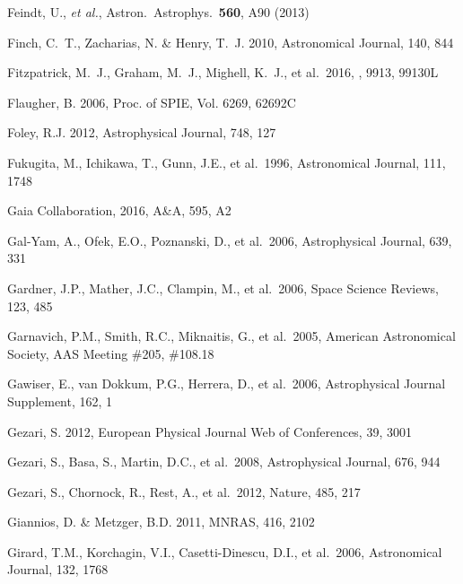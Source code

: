 \documentclass[twocolumn]{aastex61}
\begin{document}
\begin{thebibliography}{}
 Feindt, U., {\it et al.}, Astron.\ Astrophys.\  {\bf 560}, A90 (2013)

 Finch, C.~T., Zacharias, N. \& Henry, T.~J. 2010, Astronomical Journal, 140, 844

 Fitzpatrick, M.~J., Graham, M.~J., Mighell, K.~J., et al.\ 2016, \procspie, 9913, 99130L

 Flaugher, B. 2006, Proc. of SPIE, Vol. 6269, 62692C

 Foley, R.J. 2012, Astrophysical Journal, 748, 127

 Fukugita, M., Ichikawa, T., Gunn, J.E., et al.~1996, Astronomical Journal, 111, 1748

 Gaia Collaboration, 2016, A\&A, 595, A2

 Gal-Yam, A., Ofek, E.O., Poznanski, D., et al.~2006, Astrophysical Journal, 639, 331

 Gardner, J.P., Mather, J.C., Clampin, M., et al.~2006, Space Science Reviews, 123, 485

 Garnavich, P.M., Smith, R.C., Miknaitis, G., et al.~2005, American Astronomical Society, AAS Meeting \#205, \#108.18

 Gawiser, E., van Dokkum, P.G., Herrera, D., et al.~2006, Astrophysical Journal Supplement, 162, 1


 Gezari, S. 2012, European Physical Journal Web of Conferences, 39, 3001

 Gezari, S., Basa, S., Martin, D.C., et al.~2008, Astrophysical Journal, 676, 944

 Gezari, S., Chornock, R., Rest, A., et al.~2012, Nature, 485, 217

 Giannios, D. \& Metzger, B.D. 2011, MNRAS, 416, 2102

 Girard, T.M., Korchagin, V.I., Casetti-Dinescu, D.I., et al.~2006, Astronomical Journal, 132, 1768


\end{thebibliography}
\end{document}
